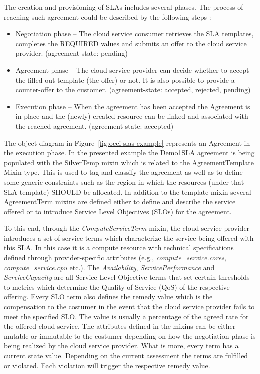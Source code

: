 \documentclass[10pt,a4paper]{article}
\begin{document}
The creation and provisioning of SLAs includes several phases.  The process of reaching such agreement could be described by the following steps :
\begin{itemize}
\item Negotiation phase -- The cloud service consumer retrieves the SLA templates, completes the REQUIRED values and submits an offer to the cloud service provider. (agreement-state: pending)
\item Agreement phase -- The cloud service provider can decide whether to accept the filled out template (the offer) or not. It is also possible to provide a counter-offer to the customer. (agreement-state: accepted, rejected, pending)
\item Execution phase -- When the agreement has been accepted the Agreement is in place and the (newly) created resource can be linked and associated with the reached agreement. (agreement-state: accepted)
\end{itemize}
The object diagram in Figure~\ref{fig:occi-slas-example} represents an Agreement in the execution phase. In the presented example the Demo1SLA agreement is being populated with the SilverTemp mixin which is related to the AgreementTemplate Mixin type. This is used to tag and classify the agreement as well as to define some generic constraints such as the region in which the resources (under that SLA template) SHOULD be allocated. In addition to the template mixin several AgreementTerm mixins are defined either to define and describe the service offered or to introduce Service Level Objectives (SLOs) for the agreement.

To this end, through the \textit{ComputeServiceTerm} mixin, the cloud service provider introduces a set of service terms which characterize the service being offered with this SLA. In this case it is a compute resource with technical specifications defined through provider-specific attributes (e.g., \textit{compute\_service.cores}, \textit{compute\_service.cpu} etc.). The \textit{Availability}, \textit{ServicePerformance} and \textit{ServiceCapacity} are all Service Level Objective terms that set certain thresholds to metrics which determine the Quality of Service (QoS) of the respective offering. Every SLO term also defines the remedy value which is the compensation to the costumer in the event that the cloud service provider fails to meet the specified SLO. The value is usually a percentage of the agreed rate for the offered cloud service. The attributes defined in the mixins can be either mutable or immutable to the costumer depending on how the negotiation phase is being realized by the cloud service provider. What is more, every term has a current state value. Depending on the current assessment the terms are fulfilled or violated. Each violation will trigger the respective remedy value.
\end{document}
